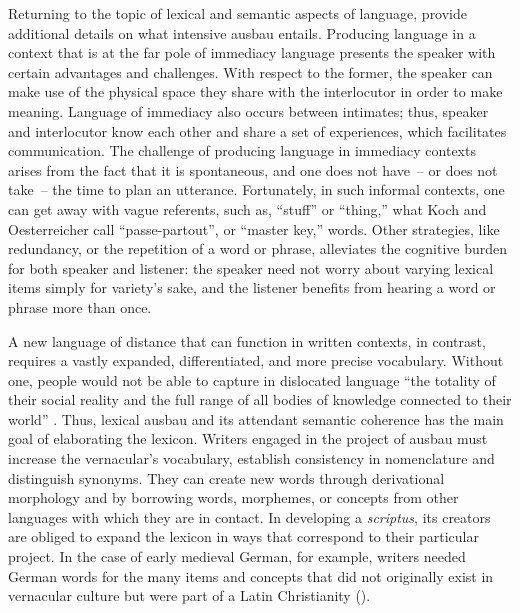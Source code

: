 Returning to the topic of lexical and semantic aspects of language, \citet[591]{KochOesterreicher1994} provide additional details on what intensive ausbau entails. Producing language in a context that is at the far pole of immediacy language presents the speaker with certain advantages and challenges. With respect to the former, the speaker can make use of the physical space they share with the interlocutor in order to make meaning. Language of immediacy also occurs between intimates; thus, speaker and interlocutor know each other and share a set of experiences, which facilitates communication. The challenge of producing language in immediacy contexts arises from the fact that it is spontaneous, and one does not have~-- or does not take~-- the time to plan an utterance. Fortunately, in such informal contexts, one can get away with vague referents, such as, “stuff” or “thing,” what Koch and Oesterreicher call “passe-partout”, or “master key,” words. Other strategies, like redundancy, or the repetition of a word or phrase, alleviates the cognitive burden for both speaker and listener: the speaker need not worry about varying lexical items simply for variety’s sake, and the listener benefits from hearing a word or phrase more than once.

A new language of distance that can function in written contexts, in contrast, requires a vastly expanded, differentiated, and more precise vocabulary. Without one, people would not be able to capture in dislocated language “the totality of their social reality and the full range of all bodies of knowledge connected to their world” \citep[591]{KochOesterreicher1994}. Thus, lexical ausbau and its attendant semantic coherence has the main goal of elaborating the lexicon. Writers engaged in the project of ausbau must increase the vernacular’s vocabulary, establish consistency in nomenclature and distinguish synonyms. They can create new words through derivational morphology and by borrowing words, morphemes, or concepts from other languages with which they are in contact. In developing a \textit{scriptus}, its creators are obliged to expand the lexicon in ways that correspond to their particular project. In the case of early medieval German, for example, writers needed German words for the many items and concepts that did not originally exist in vernacular culture but were part of a Latin Christianity ().

